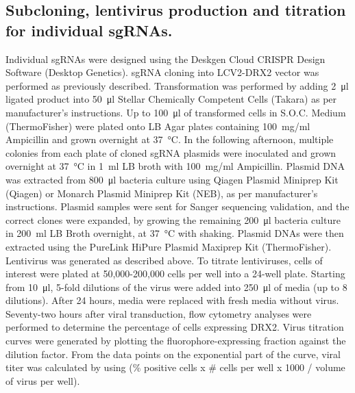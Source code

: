 \subsection{Subcloning, lentivirus production and titration for individual sgRNAs.}
Individual sgRNAs were designed using the Deskgen Cloud CRISPR Design Software (Desktop Genetics). sgRNA cloning into LCV2-DRX2 vector was performed as previously described\cite{Sanjana2014,Shalem2014}. Transformation was performed by adding \SI{2}{\micro\litre} ligated product into \SI{50}{\micro\litre} Stellar Chemically Competent Cells (Takara) as per manufacturer's instructions. Up to \SI{100}{\micro\litre} of transformed cells in S.O.C. Medium (ThermoFisher) were plated onto LB Agar plates containing \SI{100}{\milli\gram}/ml Ampicillin and grown overnight at \SI{37}{\degreeCelsius}. In the following afternoon, multiple colonies from each plate of cloned sgRNA plasmids were inoculated and grown overnight at \SI{37}{\degreeCelsius} in \SI{1}{\milli\litre} LB broth with \SI{100}{\milli\gram}/ml Ampicillin. Plasmid DNA was extracted from \SI{800}{\micro\litre} bacteria culture using Qiagen Plasmid Miniprep Kit (Qiagen) or Monarch Plasmid Miniprep Kit (NEB), as per manufacturer's instructions. Plasmid samples were sent for Sanger sequencing validation, and the correct clones were expanded, by growing the remaining \SI{200}{\micro\litre} bacteria culture in \SI{200}{\milli\litre} LB Broth overnight, at \SI{37}{\degreeCelsius} with shaking. Plasmid DNAs were then extracted using the PureLink HiPure Plasmid Maxiprep Kit (ThermoFisher). Lentivirus was generated as described above. To titrate lentiviruses, cells of interest were plated at 50,000-200,000 cells per well into a 24-well plate. Starting from \SI{10}{\micro\litre}, 5-fold dilutions of the virus were added into \SI{250}{\micro\litre} of media (up to 8 dilutions). After 24 hours, media were replaced with fresh media without virus. Seventy-two hours after viral transduction, flow cytometry analyses were performed to determine the percentage of cells expressing DRX2. Virus titration curves were generated by plotting the fluorophore-expressing fraction against the dilution factor. From the data points on the exponential part of the curve, viral titer was calculated by using (\% positive cells x \# cells per well x 1000 / volume of virus per well).

